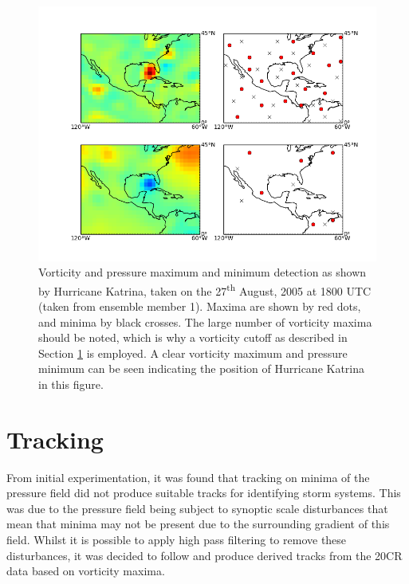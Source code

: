 \documentclass[pdftex,12pt,a4paper]{report}
\newcommand{\ts}{\textsuperscript}
\begin{document}
\begin{figure}[hb!]
    \centering
    \includegraphics[width=\textwidth]{figures/katrina_max_mins}
    \caption{Vorticity and pressure maximum and minimum detection as shown by Hurricane Katrina,
        taken on the 27\ts{th} August, 2005 at 1800 UTC (taken from ensemble member 1). Maxima are
        shown by red dots, and minima by black crosses. The large number of vorticity maxima should
        be noted, which is why a vorticity cutoff as described in Section \ref{sec:tracking} is
        employed. A clear vorticity maximum and pressure minimum can be seen indicating the position of
        Hurricane Katrina in this figure.}
    \label{fig:katrina_max_mins}
\end{figure}

\section{Tracking}
\label{sec:tracking}

From initial experimentation, it was found that tracking on minima of the pressure field did not
produce suitable tracks for identifying storm systems. This was due to the pressure field being
subject to synoptic scale disturbances that mean that minima may not be present due to the
surrounding gradient of this field. Whilst it is possible to apply high pass filtering to remove
these disturbances, it was decided to follow \textcite{reed1988evaluation, thorncroft2001african}
and produce derived tracks from the 20CR data based on vorticity maxima.
\end{document}

